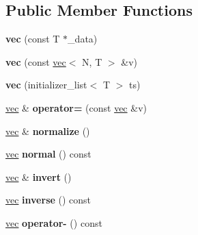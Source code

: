 \subsection*{Public Member Functions}
\begin{DoxyCompactItemize}
\item 
\hypertarget{structj3d_1_1vec_a968959eb14c5b781d86bf1167897f469}{}{\bfseries vec} (const T $\ast$\+\_\+data)\label{structj3d_1_1vec_a968959eb14c5b781d86bf1167897f469}

\item 
\hypertarget{structj3d_1_1vec_a0441969ff8864a05482eecf2d160fa96}{}{\bfseries vec} (const \hyperlink{structj3d_1_1vec}{vec}$<$ N, T $>$ \&v)\label{structj3d_1_1vec_a0441969ff8864a05482eecf2d160fa96}

\item 
\hypertarget{structj3d_1_1vec_af532a485869326dd49124cd9d3d45818}{}{\bfseries vec} (initializer\+\_\+list$<$ T $>$ ts)\label{structj3d_1_1vec_af532a485869326dd49124cd9d3d45818}

\item 
\hypertarget{structj3d_1_1vec_ae21f1e2d7d1a311ca3fc09d91e308581}{}\hyperlink{structj3d_1_1vec}{vec} \& {\bfseries operator=} (const \hyperlink{structj3d_1_1vec}{vec} \&v)\label{structj3d_1_1vec_ae21f1e2d7d1a311ca3fc09d91e308581}

\item 
\hypertarget{structj3d_1_1vec_ae165bed1d3b9974a033c307466b29cec}{}\hyperlink{structj3d_1_1vec}{vec} \& {\bfseries normalize} ()\label{structj3d_1_1vec_ae165bed1d3b9974a033c307466b29cec}

\item 
\hypertarget{structj3d_1_1vec_a0aeeb225bdef4127fcb19653342ba407}{}\hyperlink{structj3d_1_1vec}{vec} {\bfseries normal} () const \label{structj3d_1_1vec_a0aeeb225bdef4127fcb19653342ba407}

\item 
\hypertarget{structj3d_1_1vec_a72ac97c6c487de8e258f0da603829ef8}{}\hyperlink{structj3d_1_1vec}{vec} \& {\bfseries invert} ()\label{structj3d_1_1vec_a72ac97c6c487de8e258f0da603829ef8}

\item 
\hypertarget{structj3d_1_1vec_ae7619977fcd831fd5e7ce85d77e8a64f}{}\hyperlink{structj3d_1_1vec}{vec} {\bfseries inverse} () const \label{structj3d_1_1vec_ae7619977fcd831fd5e7ce85d77e8a64f}

\item 
\hypertarget{structj3d_1_1vec_a826b04b3509d0464e67007891797d673}{}\hyperlink{structj3d_1_1vec}{vec} {\bfseries operator-\/} () const \label{structj3d_1_1vec_a826b04b3509d0464e67007891797d673}


\end{DoxyCompactItemize}
